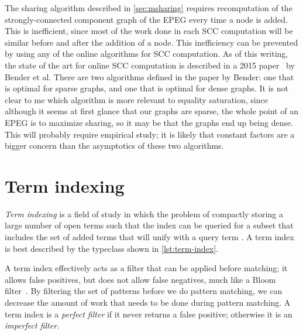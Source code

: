 \documentclass[11pt]{report}
\begin{document}
The sharing algorithm described in \autoref{sec:msharing} requires recomputation
of the strongly-connected component graph of the EPEG every time a node is
added. This is inefficient, since most of the work done in each SCC computation
will be similar before and after the addition of a node. This inefficiency can
be prevented by using any of the online algorithms for SCC computation. As of
this writing, the state of the art for online SCC computation is described in
a 2015 paper~\cite{bender-2015} by Bender et al. There are two algorithms
defined in the paper by Bender: one that is optimal for sparse graphs, and one
that is optimal for dense graphs. It is not clear to me which algorithm is more
relevant to equality saturation, since although it seems at first glance that
our graphs are sparse, the whole point of an EPEG is to maximize sharing, so
it may be that the graphs end up being dense. This will probably require
empirical study; it is likely that constant factors are a bigger concern than
the asymptotics of these two algorithms.

\section{Term indexing}
\label{sec:term-indexing}

\textit{Term indexing} is a field of study in which the problem of compactly
storing a large number of open terms such that the index can be queried for a
subset that includes the set of added terms that will unify with a query term
\cite{handbook-ch26}. A term index is best described by the typeclass shown in
\autoref{lst:term-index}.

A term index effectively acts as a filter that can be applied before matching;
it allows false positives, but does not allow false negatives, much like a
Bloom filter~\cite{bloom-1970}. By filtering the set of patterns before we do
pattern matching, we can decrease the amount of work that needs to be done
during pattern matching. A term index is a \textit{perfect filter} if it never
returns a false positive; otherwise it is an \textit{imperfect filter}.
\end{document}
